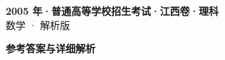 \documentclass[zihao=-4, a4paper]{ctexart}
\begin{document}
\begin{center}
  {\Large\bfseries 2005 年·普通高等学校招生考试·江西卷·理科}\\[4pt]
  {\large 数学 · 解析版}
\end{center}
\medskip
{}

\clearpage
{}
\begin{center}{\Large\bfseries 参考答案与详细解析}\end{center}
\medskip

\end{document}
